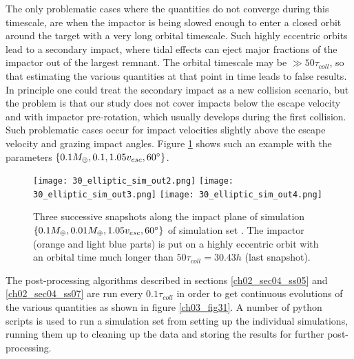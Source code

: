 The only problematic cases where the quantities do not converge during this timescale, are when the impactor is being slowed enough to enter a closed orbit around the target with a very long orbital timescale. Such highly eccentric orbits lead to a secondary impact, where tidal effects can eject major fractions of the impactor out of the largest remnant. The orbital timescale may be $\gg 50 \tau_{coll}$, so that estimating the various quantities at that point in time leads to false results. In principle one could treat the secondary impact as a new collision scenario, but the problem is that our study does not cover impacts below the escape velocity and with impactor pre-rotation, which usually develops during the first collision. Such problematic cases occur for impact velocities slightly above the escape velocity and grazing impact angles. Figure \ref{ch03_fig30} shows such an example with the parameters $\{0.1 M_{\oplus}, 0.1, 1.05 v_{esc}, 60 ^\circ \}$.
\begin{figure}
\begin{center}
\texttt{[image: 30\_elliptic\_sim\_out2.png]}
\texttt{[image: 30\_elliptic\_sim\_out3.png]}
\texttt{[image: 30\_elliptic\_sim\_out4.png]}
\caption{Three successive snapshots along the impact plane of simulation $\{0.1 M_{\oplus}, 0.01 M_{\oplus}, 1.05 v_{esc}, 60 ^\circ \}$ of simulation set \css. The impactor (orange and light blue parts) is put on a highly eccentric orbit with an orbital time much longer than $50 \tau_{coll} = 30.43h$ (last snapshot).}
\label{ch03_fig30}
\end{center}
\end{figure}

The post-processing algorithms described in sections \ref{ch02_sec04_ss05} and \ref{ch02_sec04_ss07} are run every $0.1 \tau_{coll}$ in order to get continuous evolutions of the various quantities as shown in figure \ref{ch03_fig31}. A number of python scripts is used to run a simulation set from setting up the individual simulations, running them up to cleaning up the data and storing the results for further post-processing.

